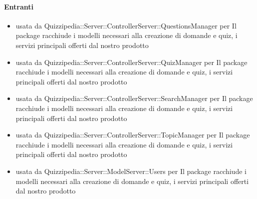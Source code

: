 \paragraph{Entranti}
\begin{itemize}
\item usata da Quizzipedia::Server::ControllerServer::QuestionsManager per Il package racchiude i modelli necessari alla creazione di domande e quiz, i servizi principali offerti dal nostro prodotto
\item usata da Quizzipedia::Server::ControllerServer::QuizManager per Il package racchiude i modelli necessari alla creazione di domande e quiz, i servizi principali offerti dal nostro prodotto
\item usata da Quizzipedia::Server::ControllerServer::SearchManager per Il package racchiude i modelli necessari alla creazione di domande e quiz, i servizi principali offerti dal nostro prodotto
\item usata da Quizzipedia::Server::ControllerServer::TopicManager per Il package racchiude i modelli necessari alla creazione di domande e quiz, i servizi principali offerti dal nostro prodotto
\item usata da Quizzipedia::Server::ModelServer::Users per Il package racchiude i modelli necessari alla creazione di domande e quiz, i servizi principali offerti dal nostro prodotto
\end{itemize}
